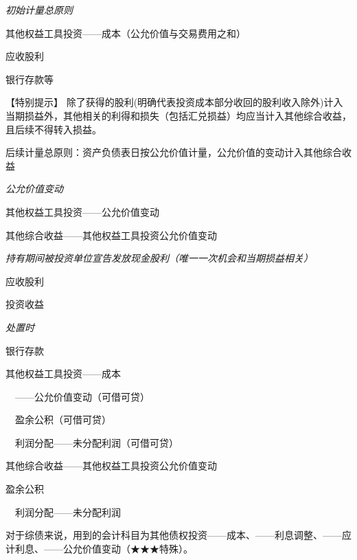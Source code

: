 \documentclass[UTF8,12pt]{ctexart}
\newenvironment{Dr}{%
	\begin{list}{}%
		{
			\setlength{\leftmargin}{2em}
			\setlength{\labelwidth}{2em}
			\setlength{\labelsep}{0pt}
			\setlength{\itemindent}{0pt}
			\setlength{\listparindent}{0pt}
			\setlength{\parsep}{0pt}
			\setlength{\topsep}{0pt}
		}
		\item[\textbf{借：}]
	}{%
	\end{list}
}
\newenvironment{Cr}{%
	\begin{list}{}%
		{
			\setlength{\leftmargin}{2em}
			\setlength{\labelwidth}{2em}
			\setlength{\labelsep}{0pt}
			\setlength{\itemindent}{0pt}
			\setlength{\listparindent}{0pt}
			\setlength{\parsep}{0pt}
			\setlength{\topsep}{0pt}
		}
		\item[\textbf{贷：}]
	}{%
	\end{list}
}
\numberwithin{equation}{section} %
\numberwithin{figure}{section}
\numberwithin{table}{section}
\begin{document}
	\textit{初始计量总原则}
	
	\begin{Dr}
		其他权益工具投资——成本（公允价值与交易费用之和）
		
		应收股利
	\end{Dr}
	\begin{Cr}
		银行存款等
	\end{Cr}

	【特别提示】
	除了获得的股利(明确代表投资成本部分收回的股利收入除外)计入当期损益外，其他相关的利得和损失（包括汇兑损益）均应当计入其他综合收益，且后续不得转入损益。
	
	后续计量总原则：资产负债表日按公允价值计量，公允价值的变动计入其他综合收益
	
	\textit{公允价值变动}
	
	\begin{Dr}
		其他权益工具投资——公允价值变动
	\end{Dr}
	\begin{Cr}
		其他综合收益——其他权益工具投资公允价值变动
	\end{Cr}


	\textit{持有期间被投资单位宣告发放现金股利（唯一一次机会和当期损益相关）}
	
	\begin{Dr}
		应收股利
	\end{Dr}
	\begin{Cr}
		投资收益
	\end{Cr}

	
	\textit{处置时}
	
	\begin{Dr}
		银行存款
	\end{Dr}
	\begin{Cr}
		其他权益工具投资——成本
		
		\ \ ——公允价值变动（可借可贷）
		
		\ \ 盈余公积（可借可贷）
		
		\ \ 利润分配——未分配利润（可借可贷）
	\end{Cr}
	
	\begin{Dr}
		其他综合收益——其他权益工具投资公允价值变动
	\end{Dr}
	\begin{Cr}
		盈余公积
		
		\ \ 利润分配——未分配利润
	\end{Cr}
	
	
	对于综债来说，用到的会计科目为其他债权投资——成本、——利息调整、——应计利息、——公允价值变动（★★★特殊）。
	
\end{document}
